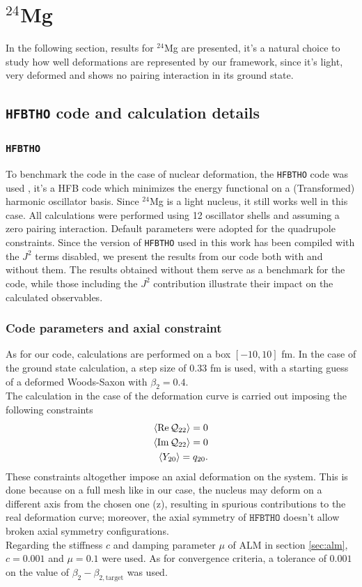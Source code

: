 \section{$^{24}$Mg}
In the following section, results for $^{24}$Mg are presented, it's a natural choice to study how well deformations are represented by our framework, since it's light, very deformed and shows no pairing interaction in its ground state.
\subsection{\texttt{HFBTHO} code and calculation details}
\subsubsection{\texttt{HFBTHO}}
To benchmark the code in the case of nuclear deformation, the \texttt{HFBTHO} code was used \cite{MAREVIC2022108367}, it's a HFB code which minimizes the energy functional on a (Transformed) harmonic oscillator basis. Since $^{24}$Mg is a light nucleus, it still works well in this case.
All calculations were performed using 12 oscillator shells and assuming a zero pairing interaction. 
Default parameters were adopted for the quadrupole constraints. 
Since the version of \texttt{HFBTHO} used in this work has been compiled with the $J^2$ terms disabled, we present the results from our code both with and without them. 
The results obtained without them serve as a benchmark for the code, 
while those including the $J^2$ contribution illustrate their impact on the calculated observables.
\subsubsection{Code parameters and axial constraint}
As for our code, calculations are performed on a box $[-10, 10]$ fm.
In the case of the ground state calculation, a step size of $0.33$ fm is used, with a starting guess of a deformed Woods-Saxon with $\beta_2=0.4$.
\\The calculation in the case of the deformation curve is carried out imposing the following constraints
\begin{align}
  \expval{\Re\mathcal Q_{22}} = 0
  \\\expval{\Im \mathcal Q_{22}} = 0
  \\\expval{Y_{20}} = q_{20}.
\end{align}
These constraints altogether impose an axial deformation on the system. This is done because on a full mesh like in our case, the nucleus may deform on a different axis from the chosen one (z), resulting in spurious contributions to the real deformation curve; moreover, the axial symmetry of $\texttt{HFBTHO}$ doesn't allow broken axial symmetry configurations.
\\Regarding the stiffness $c$ and damping parameter $\mu$ of ALM in section \ref{sec:alm}, $c=0.001$ and $\mu=0.1$ were used. As for convergence criteria, a tolerance of $0.001$ on the value of $\beta_2 - \beta_{2, \text{target}}$ was used.
